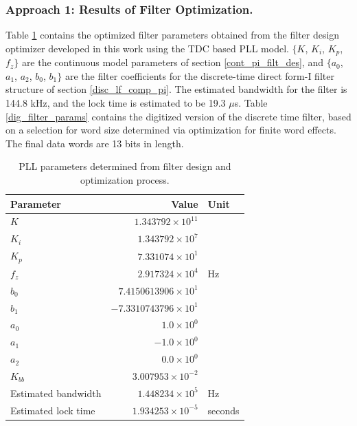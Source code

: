 \subsubsection{Approach 1: Results of Filter Optimization.}
Table \ref{filter_params} contains the optimized filter parameters obtained from the filter design optimizer developed in this work using the TDC based PLL model. $\{K$, $K_i$, $K_p$, $f_z\}$ are the continuous model parameters of section \ref{cont_pi_filt_des}, and $\{a_0$, $a_1$, $a_2$, $b_0$, $b_1\}$ are the filter coefficients for the discrete-time direct form-I filter structure of section \ref{disc_lf_comp_pi}. The estimated bandwidth for the filter is 144.8 kHz, and the lock time is estimated to be 19.3 $\mu$s. Table \ref{dig_filter_params} contains the digitized version of the discrete time filter, based on a selection for word size determined via optimization for finite word effects. The final data words are 13 bits in length.  
\begin{table}[h!]
	\centering
	\def\arraystretch{1.5}		
	\setlength\arrayrulewidth{0.75pt}
	\setlength{\tabcolsep}{1em} %
	\begin{tabular}{|l|r|l|}
		\hline 
		\rule[-1ex]{0pt}{2.5ex} \cellcolor{gray!40}\textbf{Parameter} & \cellcolor{gray!40}\textbf{Value} & \cellcolor{gray!40}\textbf{Unit }\\ 
		\hline 
		\rule[-1ex]{0pt}{2.5ex} \textbf{$K$}  & $1.343792\times10^{11}$ &  \\ 
		\hline 
		\rule[-1ex]{0pt}{2.5ex} \textbf{$K_i$}  & $1.343792\times10^{7}$ &  \\ 
		\hline 
		\rule[-1ex]{0pt}{2.5ex} \textbf{$K_p$}  & $7.331074\times10^{1}$ &  \\ 
		\hline 
		\rule[-1ex]{0pt}{2.5ex} \textbf{$f_z$} & $2.917324\times10^4$ & Hz\\ 
		\hline 
		\rule[-1ex]{0pt}{2.5ex} \textbf{$b_0$}  & $7.4150613906\times10^1$  &\\ 
		\hline 
		\rule[-1ex]{0pt}{2.5ex} \textbf{$b_1$}  & $-7.3310743796\times10^1$  & \\ 
		\hline 
		\rule[-1ex]{0pt}{2.5ex} \textbf{$a_0$}  & $1.0\times10^0$  &\\ 
		\hline 
		\rule[-1ex]{0pt}{2.5ex} \textbf{$a_1$}  & $-1.0\times10^0$  & \\ 
		\hline 
		\rule[-1ex]{0pt}{2.5ex} \textbf{$a_2$}  & $0.0\times10^0$  & \\ 
		\hline 
		\rule[-1ex]{0pt}{2.5ex} \textbf{$K_{bb}$}  & $3.007953\times10^{-2}$  & \\ 
		\hline 
		\rule[-1ex]{0pt}{2.5ex} Estimated bandwidth & $1.448234\times10^5$ & Hz \\ 
		\hline 
		\rule[-1ex]{0pt}{2.5ex} Estimated lock time & $1.934253\times10^{-5}$ & seconds \\ 
		\hline 
	\end{tabular} 
	\caption{PLL parameters determined from filter design and optimization process.}
	\label{filter_params}
\end{table}   

